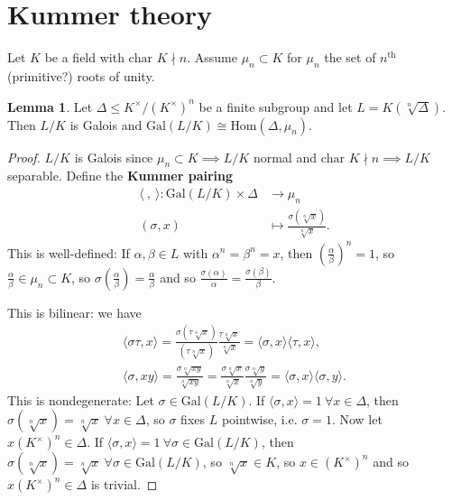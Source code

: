 \documentclass{article}
\theoremstyle{definition}
\newtheorem{lemma}[theorem]{Lemma}
\begin{document}
\section{Kummer theory}
Let $K$ be a field with $\text{char }K \nmid n$. Assume $\mu_n \subset K$ for $\mu_n$ the set of $n^{\text{th}}$ (primitive?) roots of unity.
\begin{lemma}\label{lemma11.1}
    Let $\Delta \le K^\times/(K^\times)^n$ be a finite subgroup and let $L = K(\sqrt[n]{\Delta})$. Then $L/K$ is Galois and $\text{Gal}(L/K) \cong \text{Hom}(\Delta,\mu_n)$.
\end{lemma}
\begin{proof}
    $L/K$ is Galois since $\mu_n \subset K \implies L/K$ normal and $\text{char }K \nmid n \implies L/K$ separable. Define the \textbf{Kummer pairing} 
    \begin{align*}
        \langle ~,~ \rangle : \text{Gal}(L/K) \times \Delta &\to \mu_n \\
        (\sigma,x) &\mapsto \frac{\sigma(\sqrt[n]{x})}{\sqrt[n]{x}}.
    \end{align*}
    This is well-defined: If $\alpha,\beta \in L$ with $\alpha^n=\beta^n=x$, then $\left(\frac{\alpha}{\beta}\right)^n=1$, so $\frac{\alpha}{\beta} \in \mu_n \subset K$, so $\sigma \left(\frac{\alpha}{\beta}\right) = \frac{\alpha}{\beta}$ and so $\frac{\sigma(\alpha)}{\alpha} = \frac{\sigma(\beta)}{\beta}$.
    \vspace{1mm}
     
    This is bilinear: we have
    \begin{align*}
        \langle \sigma \tau, x \rangle = \frac{\sigma(\tau \sqrt[n]{x})}{(\tau \sqrt[n]{x})} \frac{\tau \sqrt[n]{x}}{\sqrt[n]{x}} = \langle \sigma,x \rangle \langle \tau, x \rangle,\\
        \langle \sigma,xy \rangle = \frac{\sigma \sqrt[n]{xy}}{\sqrt[n]{xy}} = \frac{\sigma \sqrt[n]{x}}{\sqrt[n]{x}}\frac{\sigma \sqrt[n]{y}}{\sqrt[n]{y}} = \langle \sigma,x \rangle \langle \sigma,y \rangle.
    \end{align*} 
    This is nondegenerate: Let $\sigma \in \text{Gal}(L/K)$. If $\langle \sigma,x \rangle = 1 ~\forall x \in \Delta$, then $\sigma(\sqrt[n]{x})=\sqrt[n]{x} ~\forall x \in \Delta$, so $\sigma$ fixes $L$ pointwise, i.e. $\sigma=1$. Now let $x(K^\times)^n \in \Delta$. If $\langle \sigma, x \rangle = 1~\forall \sigma \in \text{Gal}(L/K)$, then $\sigma(\sqrt[n]{x})=\sqrt[n]{x}~\forall \sigma \in \text{Gal}(L/K)$, so $\sqrt[n]{x} \in K$, so $x \in (K^\times)^n$ and so $x(K^{\times})^n \in \Delta$ is trivial.
    \vspace{1mm}
     

\end{proof}
\end{document}
